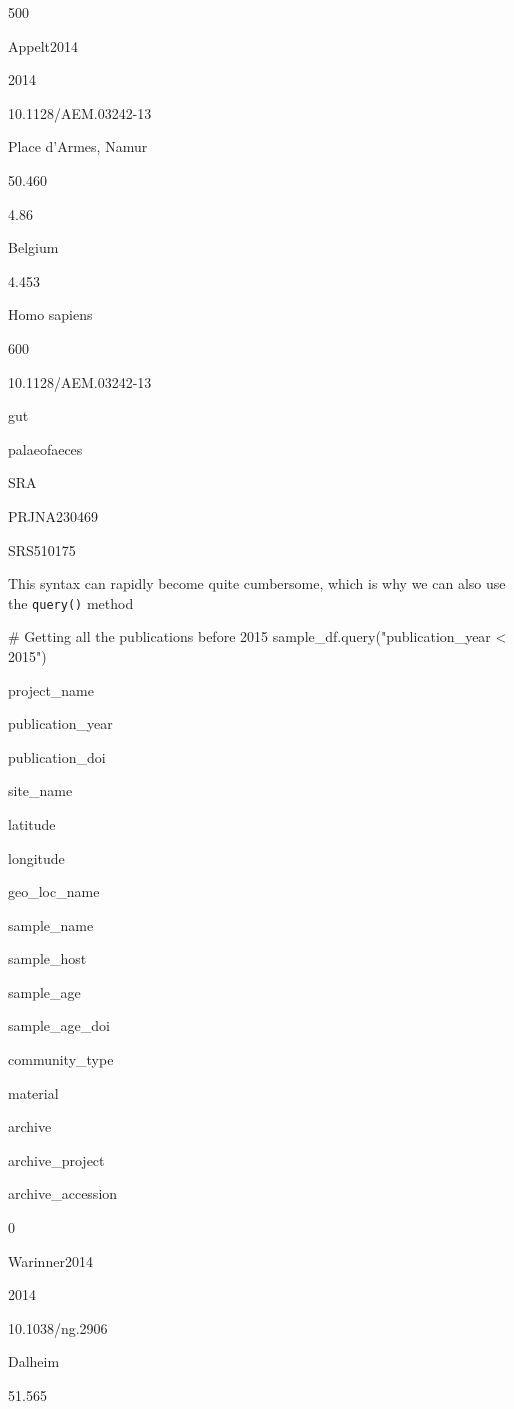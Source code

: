 \documentclass[
  letterpaper,
]{book}
\newenvironment{Shaded}{}{}
\newcommand{\CommentTok}[1]{\textcolor[rgb]{0.42,0.45,0.49}{#1}}
\newcommand{\NormalTok}[1]{\textcolor[rgb]{0.14,0.16,0.18}{#1}}
\newcommand{\StringTok}[1]{\textcolor[rgb]{0.01,0.18,0.38}{#1}}
\begin{document}
500

Appelt2014

2014

10.1128/AEM.03242-13

Place d'Armes, Namur

50.460

4.86

Belgium

4.453

Homo sapiens

600

10.1128/AEM.03242-13

gut

palaeofaeces

SRA

PRJNA230469

SRS510175

This syntax can rapidly become quite cumbersome, which is why we can
also use the \texttt{query()} method

\begin{Shaded}
\begin{Highlighting}[]
\CommentTok{\# Getting all the publications before 2015}
\NormalTok{sample\_df.query(}\StringTok{"publication\_year \textless{} 2015"}\NormalTok{)}
\end{Highlighting}
\end{Shaded}

project\_name

publication\_year

publication\_doi

site\_name

latitude

longitude

geo\_loc\_name

sample\_name

sample\_host

sample\_age

sample\_age\_doi

community\_type

material

archive

archive\_project

archive\_accession

0

Warinner2014

2014

10.1038/ng.2906

Dalheim

51.565
\end{document}
